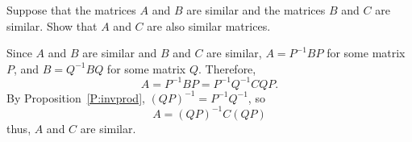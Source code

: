 \documentclass{ximera}
\begin{document}
\begin{exercise} \label{c6.5.1}
Suppose that the matrices $A$ and $B$ are similar and the matrices
$B$ and $C$ are similar.  Show that $A$ and $C$ are also similar
matrices.

\begin{solution}

Since $A$ and $B$ are similar and $B$ and $C$ are similar,
$A = P^{-1}BP$ for some matrix $P$, and $B = Q^{-1}BQ$
for some matrix $Q$.  Therefore,
\[ A = P^{-1}BP = P^{-1}Q^{-1}CQP. \]
By Proposition~\ref{P:invprod}, $(QP)^{-1} = P^{-1}Q^{-1}$, so
\[ A = (QP)^{-1}C(QP) \]
thus, $A$ and $C$ are similar.

\end{solution}
\end{exercise}
\end{document}

